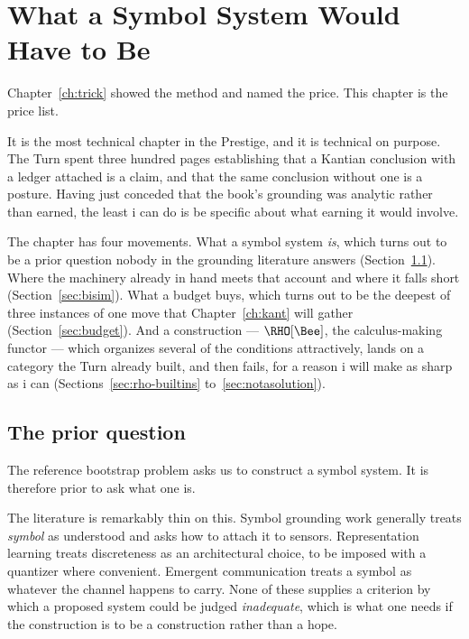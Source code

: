 \chapter{What a Symbol System Would Have to Be}
\label{ch:notation}

Chapter~\ref{ch:trick} showed the method and named the price.
This chapter is the price list.

It is the most technical chapter in the Prestige, and it is
technical on purpose.
The Turn spent three hundred pages establishing that a Kantian
conclusion with a ledger attached is a claim, and that the same
conclusion without one is a posture.
Having just conceded that the book's grounding was analytic rather
than earned, the least i can do is be specific about what earning
it would involve.

The chapter has four movements.
What a symbol system \emph{is}, which turns out to be a prior
question nobody in the grounding literature answers
(Section~\ref{sec:goodman}).
Where the machinery already in hand meets that account and where it
falls short (Section~\ref{sec:bisim}).
What a budget buys, which turns out to be the deepest of three
instances of one move that Chapter~\ref{ch:kant} will gather
(Section~\ref{sec:budget}).
And a construction --- $\RHO[\Bee]$, the calculus-making functor
--- which organizes several of the conditions attractively, lands
on a category the Turn already built, and then fails, for a reason
i will make as sharp as i can (Sections~\ref{sec:rho-builtins}
to~\ref{sec:notasolution}).

\section{The prior question}
\label{sec:goodman}

The reference bootstrap problem asks us to construct a symbol
system.
It is therefore prior to ask what one is.

The literature is remarkably thin on this.
Symbol grounding work generally treats \emph{symbol} as understood
and asks how to attach it to sensors.
Representation learning treats discreteness as an architectural
choice, to be imposed with a quantizer where convenient.
Emergent communication treats a symbol as whatever the channel
happens to carry.
None of these supplies a criterion by which a proposed system could
be judged \emph{inadequate}, which is what one needs if the
construction is to be a construction rather than a hope.

